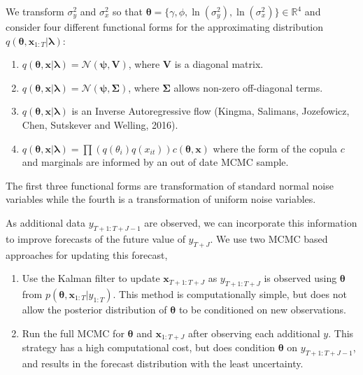 \documentclass[12pt,a4paper]{article}%
\numberwithin{equation}{section}
\begin{document}
We transform $\sigma^2_y$ and $\sigma^2_x$ so that $\boldsymbol{\theta} = \{\gamma, \phi, \ln(\sigma^2_y), \ln(\sigma^2_x) \} \in \mathbb{R}^4$ and consider four different functional forms for the approximating distribution $q(\boldsymbol{\theta}, \textbf{x}_{1:T} | \boldsymbol{\lambda})$:
\begin{enumerate}
\item $q(\boldsymbol{\theta}, \textbf{x} | \boldsymbol{\lambda}) = \mathcal{N}(\boldsymbol{\psi}, \textbf{V})$, where $\textbf{V}$ is a diagonal matrix.
\item $q(\boldsymbol{\theta}, \textbf{x} | \boldsymbol{\lambda}) = \mathcal{N}(\boldsymbol{\psi}, \boldsymbol{\Sigma})$, where $\boldsymbol{\Sigma}$ allows non-zero off-diagonal terms.
\item $q(\boldsymbol{\theta}, \textbf{x} | \boldsymbol{\lambda})$ is an Inverse Autoregressive flow (Kingma, Salimans, Jozefowicz, Chen, Sutskever and Welling, 2016).
\item  $q(\boldsymbol{\theta}, \textbf{x} | \boldsymbol{\lambda}) = \prod \left(q(\theta_i) q(x_{it})\right) c(\boldsymbol{\theta}, \textbf{x})$ where the form of the copula $c$ and marginals are informed by an out of date MCMC sample.
\end{enumerate}
The first three functional forms are transformation of standard normal noise variables while the fourth is a transformation of uniform noise variables.

As additional data $y_{T+1:T+J-1}$ are observed, we can incorporate this information to improve forecasts of the future value of $y_{T+J}$. We use two MCMC based approaches for updating this forecast,
\begin{enumerate}
\item Use the Kalman filter to update $\textbf{x}_{T+1:T+J}$ as $y_{T+1:T+J}$ is observed using $\boldsymbol{\theta}$ from $p(\boldsymbol{\theta}, \textbf{x}_{1:T} | y_{1:T})$. This method is computationally simple, but does not allow the posterior distribution of $\boldsymbol{\theta}$ to be conditioned on new observations.
\item Run the full MCMC for $\boldsymbol{\theta}$ and $\textbf{x}_{1:T+J}$ after observing each additional $y$. This strategy has a high computational cost, but does condition $\boldsymbol{\theta}$ on $y_{T+1:T+J-1}$, and results in the forecast distribution with the least uncertainty.
\end{enumerate}
\end{document}
